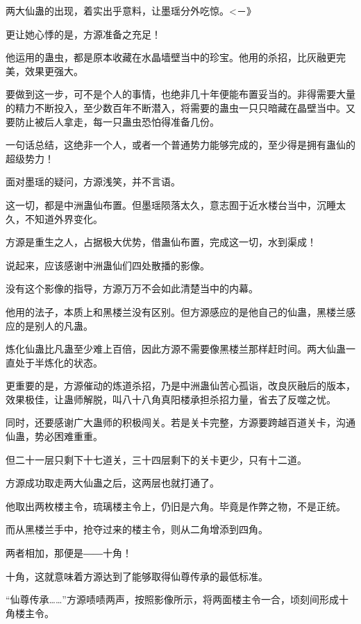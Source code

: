 
\begin{this_body}

两大仙蛊的出现，着实出乎意料，让墨瑶分外吃惊。<－》

更让她心悸的是，方源准备之充足！

他运用的蛊虫，都是原本收藏在水晶墙壁当中的珍宝。他用的杀招，比灰融更完美，效果更强大。

要做到这一步，可不是个人的事情，也绝非几十年便能布置妥当的。非得需要大量的精力不断投入，至少数百年不断潜入，将需要的蛊虫一只只暗藏在晶壁当中。又要防止被后人拿走，每一只蛊虫恐怕得准备几份。

一句话总结，这绝非一个人，或者一个普通势力能够完成的，至少得是拥有蛊仙的超级势力！

面对墨瑶的疑问，方源浅笑，并不言语。

这一切，都是中洲蛊仙布置。但墨瑶陨落太久，意志囿于近水楼台当中，沉睡太久，不知道外界变化。

方源是重生之人，占据极大优势，借蛊仙布置，完成这一切，水到渠成！

说起来，应该感谢中洲蛊仙们四处散播的影像。

没有这个影像的指导，方源万万不会如此清楚当中的内幕。

他用的法子，本质上和黑楼兰没有区别。但方源感应的是他自己的仙蛊，黑楼兰感应的是别人的凡蛊。

炼化仙蛊比凡蛊至少难上百倍，因此方源不需要像黑楼兰那样赶时间。两大仙蛊一直处于半炼化的状态。

更重要的是，方源催动的炼道杀招，乃是中洲蛊仙苦心孤诣，改良灰融后的版本，效果极佳，让蛊师解脱，叫八十八角真阳楼承担杀招力量，省去了反噬之忧。

同时，还要感谢广大蛊师的积极闯关。若是关卡完整，方源要跨越百道关卡，沟通仙蛊，势必困难重重。

但二十一层只剩下十七道关，三十四层剩下的关卡更少，只有十二道。

方源成功取走两大仙蛊之后，这两层也就打通了。

他取出两枚楼主令，琉璃楼主令上，仍旧是六角。毕竟是作弊之物，不是正统。

而从黑楼兰手中，抢夺过来的楼主令，则从二角增添到四角。

两者相加，那便是――十角！

十角，这就意味着方源达到了能够取得仙尊传承的最低标准。

“仙尊传承……”方源啧啧两声，按照影像所示，将两面楼主令一合，顷刻间形成十角楼主令。


\end{this_body}
